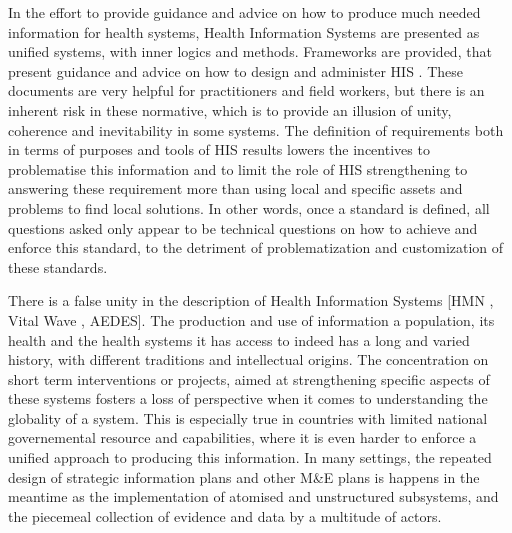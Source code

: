 




In the effort to provide guidance and advice on how to produce much needed information for health systems, Health Information Systems are presented as unified systems, with inner logics and methods. Frameworks are provided, that present guidance and advice on how to design and administer HIS \cite{health_metrics_network_framework_2008}. These documents are very helpful for practitioners and field workers, but there is an inherent risk in these normative, which is to provide an illusion of unity, coherence and inevitability in some systems. The definition of requirements both in terms of purposes and tools of HIS results lowers the incentives to problematise this information and to limit the role of HIS strengthening to answering these requirement more than using local and specific assets and problems to find local solutions. In other words, once a standard is defined, all questions asked only appear to be technical questions on how to achieve and enforce this standard, to the detriment of problematization and customization of these standards.%


There is a false unity in the description of Health Information Systems [HMN , Vital Wave , AEDES]. The production and use of information a population, its health and the health systems it has access to indeed has a long and varied history, with different traditions and intellectual origins. The concentration on short term interventions or projects, aimed at strengthening specific aspects of these systems fosters a loss of perspective when it comes to understanding the globality of a system. This is especially true in countries with limited national governemental resource and capabilities, where it is even harder to enforce a unified approach to producing this information. In many settings, the repeated design of strategic information plans and other M&E plans is happens in the meantime as the implementation of atomised and unstructured subsystems, and the piecemeal collection of  evidence and data by a multitude of actors.

